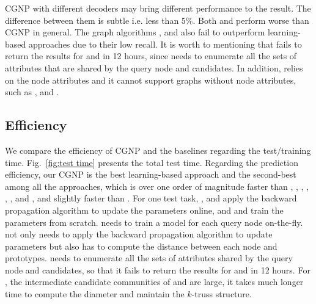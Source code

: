 CGNP with different decoders may bring different performance to the
result. The difference between them is subtle i.e. less than $5\%$. 
Both \MAML and \Reptile perform worse than CGNP in general.  The graph
algorithms \ATC, \ACQ and \CTC also fail to outperform learning-based
approaches due to their low recall. 
It is worth to mentioning that \ACQ fails to return the results for \Citeseercora and \Citeseer in 12 hours, since \ACQ needs to enumerate all the sets of attributes that are shared by the query node and candidates.
In addition, \ACQ relies on the node attributes and it cannot support graphs
without node attributes, such as \Arxiv, \DBLP and \Reddit.

%




\subsection{Efficiency}
\label{sec:exp:effic}



We compare the efficiency of CGNP and the baselines regarding the
test/training time.  Fig.~\ref{fig:test time} presents the total test
time.  Regarding the prediction efficiency, our CGNP is the best
learning-based approach and the second-best among all the approaches,
which is over one order of magnitude faster than \ATC, \ACQ, \MAML,
\Reptile, \PN, \Supervise, \ICSGNN and \AQDGNN, and slightly faster
than \Featrans.  For one test task, \MAML, \Reptile and \Featrans
apply the backward propagation algorithm to update the parameters
online, and \Supervise and \AQDGNN train the parameters from scratch.
\ICSGNN needs to train a model for each query node on-the-fly.  \PN
not only needs to apply the backward propagation algorithm to update
parameters but also has to compute the distance between each node and
prototypes.  \ACQ needs to enumerate all the sets of
attributes shared by the query node and candidates, so that
it fails to return the results for \Citeseercora and \Citeseer in 12
hours.  For \CTC, the intermediate candidate communities of \Reddit
and \Facebook are large, it takes much longer time to compute the
diameter and maintain the $k$-truss structure.


